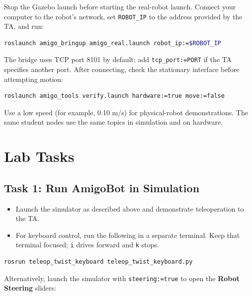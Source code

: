 \documentclass[12pt]{article}
\begin{document}
Stop the Gazebo launch before starting the real-robot launch. Connect your
computer to the robot's network, set \texttt{ROBOT\_IP} to the address
provided by the TA, and run:

\begin{tcolorbox}
\begin{lstlisting}[language=bash]
roslaunch amigo_bringup amigo_real.launch robot_ip:=$ROBOT_IP
\end{lstlisting}
\end{tcolorbox}

The bridge uses TCP port 8101 by default; add \texttt{tcp\_port:=PORT}
if the TA specifies another port. After connecting, check the stationary
interface before attempting motion:

\begin{tcolorbox}
\begin{lstlisting}[language=bash]
roslaunch amigo_tools verify.launch hardware:=true move:=false
\end{lstlisting}
\end{tcolorbox}

Use a low speed (for example, 0.10 m/s) for physical-robot demonstrations.
The same student nodes use the same topics in simulation and on hardware.

\section{Lab Tasks}
\subsection*{Task 1: Run AmigoBot in Simulation}

\begin{itemize}
  \item Launch the simulator as described above and demonstrate teleoperation to the TA.
  \item For keyboard control, run the following in a separate terminal. Keep that terminal focused; \texttt{i} drives forward and \texttt{k} stops.
\end{itemize}

\begin{tcolorbox}
\begin{lstlisting}[language=bash]
rosrun teleop_twist_keyboard teleop_twist_keyboard.py
\end{lstlisting}
\end{tcolorbox}

Alternatively, launch the simulator with \texttt{steering:=true} to open
the \textbf{Robot Steering} sliders:
\end{document}
